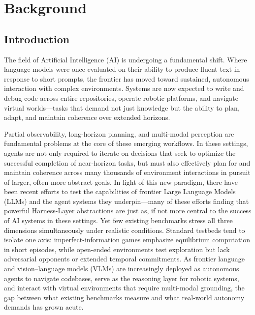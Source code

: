 
\section{Background}\label{sec:background}

\subsection{Introduction}\label{sec:introduction}

The field of Artificial Intelligence (AI) is undergoing a fundamental shift. Where language models were once evaluated on their ability to produce fluent text in response to short prompts, the frontier has moved toward sustained, autonomous interaction with complex environments. Systems are now expected to write and debug code across entire repositories, operate robotic platforms, and navigate virtual worlds---tasks that demand not just knowledge but the ability to plan, adapt, and maintain coherence over extended horizons.

Partial observability, long-horizon planning, and multi-modal perception are fundamental problems at the core of these emerging workflows. In these settings, agents are not only required to iterate on decisions that seek to optimize the successful completion of near-horizon tasks, but must also effectively plan for and maintain coherence across many thousands of environment interactions in pursuit of larger, often more abstract goals. In light of this new paradigm, there have been recent efforts to test the capabilities of frontier Large Language Models (LLMs) and the agent systems they underpin---many of these efforts finding that powerful Harness-Layer abstractions are just as, if not more central to the success of AI systems in these settings. Yet few existing benchmarks stress all three dimensions simultaneously under realistic conditions. Standard testbeds tend to isolate one axis: imperfect-information games emphasize equilibrium computation in short episodes, while open-ended environments test exploration but lack adversarial opponents or extended temporal commitments. As frontier language and vision--language models (VLMs) are increasingly deployed as autonomous agents to navigate codebases, serve as the reasoning layer for robotic systems, and interact with virtual environments that require multi-modal grounding, the gap between what existing benchmarks measure and what real-world autonomy demands has grown acute.

